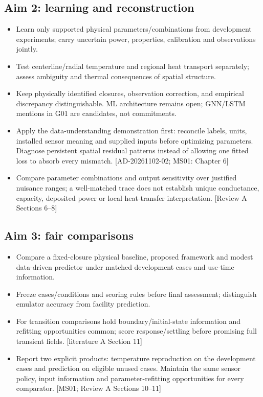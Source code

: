 \subsection{Aim 2: learning and reconstruction}
\begin{itemize}[leftmargin=*]
\item Learn only supported physical parameters/combinations from development experiments; carry uncertain power, properties, calibration and observations jointly.
\item Test centerline/radial temperature and regional heat transport separately; assess ambiguity and thermal consequences of spatial structure.
\item Keep physically identified closures, observation correction, and empirical discrepancy distinguishable. ML architecture remains open; GNN/LSTM mentions in G01 are candidates, not commitments.
\item Apply the data-understanding demonstration first: reconcile labels, units, installed sensor meaning and supplied inputs before optimizing parameters. Diagnose persistent spatial residual patterns instead of allowing one fitted loss to absorb every mismatch. [AD-20261102-02; MS01: Chapter 6]
\item Compare parameter combinations and output sensitivity over justified nuisance ranges; a well-matched trace does not establish unique conductance, capacity, deposited power or local heat-transfer interpretation. [Review A Sections 6--8]\cite{raue2009identifiability}
\end{itemize}

\subsection{Aim 3: fair comparisons}
\begin{itemize}[leftmargin=*]
\item Compare a fixed-closure physical baseline, proposed framework and modest data-driven predictor under matched development cases and use-time information.
\item Freeze cases/conditions and scoring rules before final assessment; distinguish emulator accuracy from facility prediction.
\item For transition comparisons hold boundary/initial-state information and refitting opportunities common; score response/settling before promising full transient fields. [literature A Section 11]
\item Report two explicit products: temperature reproduction on the development cases and prediction on eligible unused cases. Maintain the same sensor policy, input information and parameter-refitting opportunities for every comparator. [MS01; Review A Sections 10--11]
\end{itemize}

